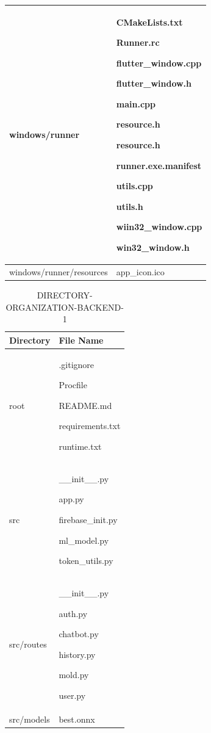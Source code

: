 \documentclass[conference]{IEEEtran}
\begin{document}
\begin{table}[h]
\begin{tabular}{|p{3.7cm}|p{4.1cm}|}
        windows/runner \par   & \par CMakeLists.txt \par Runner.rc \par flutter\_window.cpp \par flutter\_window.h \par main.cpp \par resource.h \par resource.h \par runner.exe.manifest \par utils.cpp \par utils.h \par wiin32\_window.cpp \par win32\_window.h
        \\ \hline

        windows/runner/resources   & \par app\_icon.ico
        \\ \hline
        
\end{tabular}
\end{table}

\begin{table}[h!]
\caption{DIRECTORY-ORGANIZATION-BACKEND-1}
\def\arraystretch{1.24} \small
    \begin{tabular}{|p{3.8cm}|p{4.3cm}|}
        \hline
        Directory & File Name \\ \hline
          root \par   & \par .gitignore \par Procfile \par README.md \par requirements.txt \par runtime.txt
        \\ \hline

        src \par   & \par \_\_init\_\_.py \par app.py \par firebase\_init.py \par ml\_model.py \par token\_utils.py
        \\ \hline

        src/routes \par   & \par \_\_init\_\_.py \par auth.py \par chatbot.py \par history.py \par mold.py \par user.py
        \\ \hline

        src/models \par   & \par best.onnx
        \\ \hline

\end{tabular}
\end{table}
\end{document}
